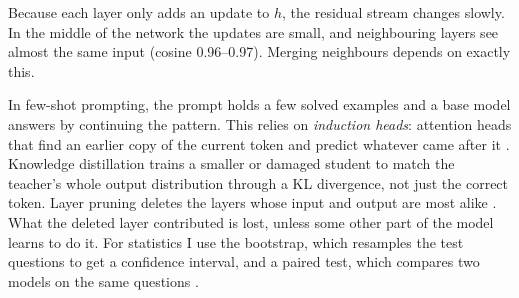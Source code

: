 \documentclass[11pt]{article}
\begin{document}
Because each layer only adds an update to $h$, the residual stream changes slowly. In the middle of the network the
updates are small, and neighbouring layers see almost the same input (cosine 0.96--0.97). Merging neighbours depends
on exactly this.

In few-shot prompting, the prompt holds a few solved examples and a base model answers by continuing the pattern.
This relies on \emph{induction heads}: attention heads that find an earlier copy of the current token and predict
whatever came after it \citep{olsson2022}. Knowledge distillation \citep{hinton2015} trains a smaller or damaged
student to match the teacher's whole output distribution through a KL divergence, not just the correct token. Layer
pruning deletes the layers whose input and output are most alike \citep{gromov2024,shortgpt}. What the deleted layer
contributed is lost, unless some other part of the model learns to do it. For statistics I use the bootstrap, which
resamples the test questions to get a confidence interval, and a paired test, which compares two models on the same
questions \citep{efron1993}.
\end{document}
